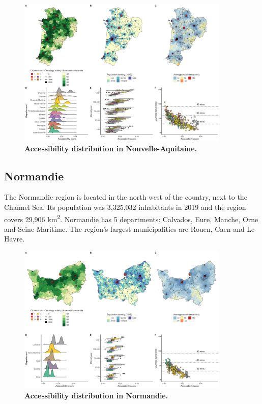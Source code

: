 \begin{figure}[H]
    \includegraphics[width=0.9\textwidth]{images/camion/region_accessibility/accessibility_Nouvelle-Aquitaine.png}
    \centering
    \caption{
        \textbf{Accessibility distribution in Nouvelle-Aquitaine.}
    }
\end{figure}

\subsection*{Normandie}

The Normandie region is located in the north west of the country, next to the Channel Sea. Its population was 3,325,032 inhabitants in 2019 and the region covers 29,906 km\textsuperscript{2}. Normandie has 5 departments: Calvados, Eure, Manche, Orne and Seine-Maritime. The region's largest municipalities are Rouen, Caen and Le Havre.

\begin{figure}[H]
    \includegraphics[width=0.9\textwidth]{images/camion/region_accessibility/accessibility_Normandie.png}
    \centering
    \caption{
        \textbf{Accessibility distribution in Normandie.}
    }
\end{figure}

